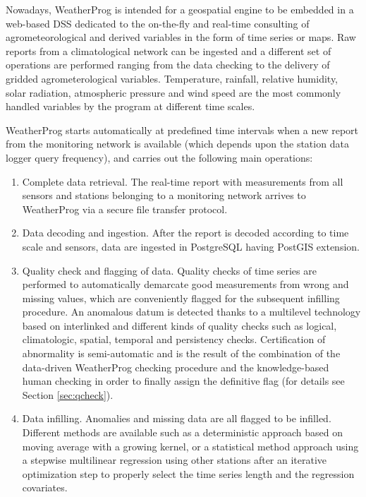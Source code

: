 \documentclass[authoryear,preprint,review,12pt]{elsarticle}
\begin{document}
Nowadays, WeatherProg is intended for a geospatial engine to be embedded in a web-based DSS dedicated to the on-the-fly and real-time consulting of agrometeorological and derived variables in the form of time series or maps.
Raw reports from a climatological network can be ingested and a different set of operations are performed ranging from the data checking to the delivery of gridded agrometerological variables.
Temperature, rainfall, relative humidity, solar radiation, atmospheric pressure and wind speed are the most commonly handled variables by the program at different time scales.

WeatherProg starts automatically at predefined time intervals when a new report from the monitoring network is available (which depends upon the station data logger query frequency), and carries out the following main operations:
\begin{enumerate}
    \item Complete data retrieval. The real-time report with measurements from all sensors and stations belonging to a monitoring network arrives to WeatherProg via a secure file transfer protocol.
    
    \item Data decoding and ingestion. After the report is decoded according to time scale and sensors, data are ingested in PostgreSQL having PostGIS extension.

    \item Quality check and flagging of data. Quality checks of time series are performed to automatically demarcate good measurements from wrong and missing values, which are conveniently flagged for the subsequent infilling procedure.
    An anomalous datum is detected thanks to a multilevel technology based on interlinked and different kinds of quality checks such as logical, climatologic, spatial, temporal and persistency checks. Certification of abnormality is semi-automatic and is the result of the combination of the data-driven WeatherProg checking procedure and the knowledge-based human checking in order to finally assign the definitive flag (for details see Section \ref{sec:qcheck}).
    
    \item Data infilling. Anomalies and missing data are all flagged to be %
    infilled.
    Different methods are available such as a deterministic approach based on moving average with a growing kernel, or a statistical method approach using a stepwise multilinear regression using other stations after an iterative optimization step to properly select the time series length and the regression covariates.
    

\end{enumerate}
\end{document}
